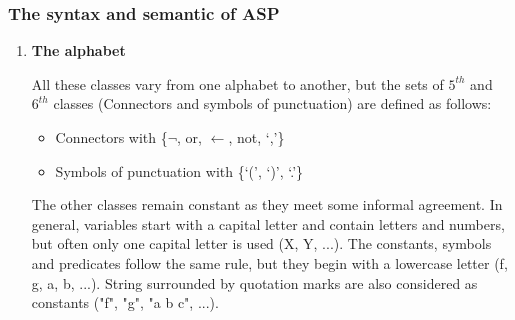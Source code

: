 \subsubsection{The syntax and semantic of ASP}
\label{sectionSyntaxeASP}
\begin{enumerate}
\item \textbf{The alphabet}

All these classes vary from one alphabet to another, but the sets of $ 5^{th} $ and $ 6^{th} $ classes (Connectors and symbols of punctuation) are defined as follows:
\begin{itemize}
  \item Connectors with \{$\neg$, or, $\leftarrow$, not, ‘,’\}
  \item Symbols of punctuation with \{‘(’, ‘)’, ‘.’\}
\end{itemize}

The other classes remain constant as they meet some informal agreement. In general, variables start with a capital letter and contain letters and numbers, but often only one capital letter is used (\eg X, Y, ...).
The constants, symbols and predicates follow the same rule, but they begin with a lowercase letter (\eg f, g, a, b, ...).
String surrounded by quotation marks are also considered as constants (\eg "f", "g", "a b c", ...).


\end{enumerate}
